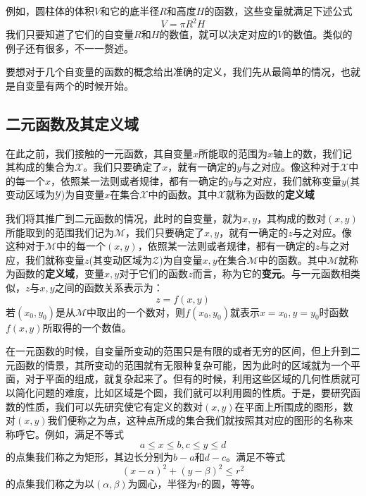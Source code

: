 \documentclass[lang=cn,10pt]{elegantbook}
\begin{document}
例如，圆柱体的体积$V$和它的底半径$R$和高度$H$的函数，这些变量就满足下述公式
\begin{equation*}
	V=\pi R^{2}H
\end{equation*}
我们只要知道了它们的自变量$R$和$H$的数值，就可以决定对应的$V$的数值。类似的例子还有很多，不一一赘述。

要想对于几个自变量的函数的概念给出准确的定义，我们先从最简单的情况，也就是自变量有两个的时候开始。
\subsection{二元函数及其定义域}
在此之前，我们接触的一元函数，其自变量$x$所能取的范围为$x$轴上的数，我们记其构成的集合为$\mathcal{X}$。我们只要确定了$x$，就有一确定的$y$与之对应。像这种对于$\mathcal{X}$中的每一个$x$，依照某一法则或者规律，都有一确定的$y$与之对应，我们就称变量$y$(其变动区域为$\mathcal{Y}$)为自变量$x$在集合$\mathcal{X}$中的函数。其中$\mathcal{X}$就称为函数的\textbf{定义域}

我们将其推广到二元函数的情况，此时的自变量，就为$x,y$，其构成的数对$(x,y)$所能取到的范围我们记为$\mathcal{M}$，我们只要确定了$x,y$，就有一确定的$z$与之对应。像这种对于$\mathcal{M}$中的每一个$(x,y)$，依照某一法则或者规律，都有一确定的$z$与之对应，我们就称变量$z$(其变动区域为$\mathcal{Z}$)为自变量$x,y$在集合$\mathcal{M}$中的函数。其中$\mathcal{M}$就称为函数的\textbf{定义域}，变量$x,y$对于它们的函数$z$而言，称为它的\textbf{变元}。与一元函数相类似，$z$与$x,y$之间的函数关系表示为：
\begin{equation*}
	z=f(x,y)
\end{equation*}
若$(x_{0},y_{0})$是从$\mathcal{M}$中取出的一个数对，则$f(x_{0},y_{0})$就表示$x=x_{0},y=y_{0}$时函数$f(x,y)$所取得的一个数值。

在一元函数的时候，自变量所变动的范围只是有限的或者无穷的区间，但上升到二元函数的情景，其所变动的范围就有无限种复杂可能，因为此时的区域就为一个平面，对于平面的组成，就复杂起来了。但有的时候，利用这些区域的几何性质就可以简化问题的难度，比如区域是个圆，我们就可以利用圆的性质。于是，要研究函数的性质，我们可以先研究使它有定义的数对$(x,y)$在平面上所围成的图形，数对$(x,y)$我们便称之为点，这种点所成的集合我们就按照其对应的图形的名称来称呼它。例如，满足不等式
\begin{equation*}
	a\le x \le b ,c\le y \le d
\end{equation*}
的点集我们称之为矩形，其边长分别为$b-a$和$d-c$。满足不等式
\begin{equation*}
	(x-\alpha)^{2}+(y-\beta)^{2}\le r^{2}
\end{equation*}
的点集我们称之为以$(\alpha,\beta)$为圆心，半径为$r$的圆，等等。
\end{document}

